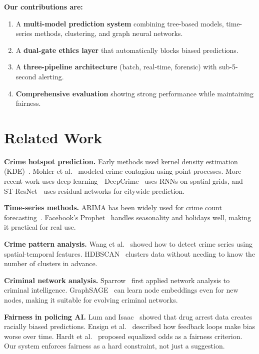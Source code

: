 \documentclass[a4paper,10pt,twocolumn]{article}
\begin{document}
\textbf{Our contributions are:}
\begin{enumerate}
  \item A \textbf{multi-model prediction system} combining tree-based models, time-series methods, clustering, and graph neural networks.
  \item A \textbf{dual-gate ethics layer} that automatically blocks biased predictions.
  \item A \textbf{three-pipeline architecture} (batch, real-time, forensic) with sub-5-second alerting.
  \item \textbf{Comprehensive evaluation} showing strong performance while maintaining fairness.
\end{enumerate}

\section{Related Work}

\textbf{Crime hotspot prediction.} Early methods used kernel density estimation (KDE)~\cite{chainey2008utility}. Mohler et al.~\cite{mohler2011self} modeled crime contagion using point processes. More recent work uses deep learning---DeepCrime~\cite{huang2018deepcrime} uses RNNs on spatial grids, and ST-ResNet~\cite{zhang2017deep} uses residual networks for citywide prediction.

\textbf{Time-series methods.} ARIMA has been widely used for crime count forecasting~\cite{chen2008forecasting}. Facebook's Prophet~\cite{taylor2018forecasting} handles seasonality and holidays well, making it practical for real use.

\textbf{Crime pattern analysis.} Wang et al.~\cite{wang2013automatic} showed how to detect crime series using spatial-temporal features. HDBSCAN~\cite{mcinnes2017hdbscan} clusters data without needing to know the number of clusters in advance.

\textbf{Criminal network analysis.} Sparrow~\cite{sparrow1991application} first applied network analysis to criminal intelligence. GraphSAGE~\cite{hamilton2017inductive} can learn node embeddings even for new nodes, making it suitable for evolving criminal networks.

\textbf{Fairness in policing AI.} Lum and Isaac~\cite{lum2016predict} showed that drug arrest data creates racially biased predictions. Ensign et al.~\cite{ensign2018runaway} described how feedback loops make bias worse over time. Hardt et al.~\cite{hardt2016equality} proposed equalized odds as a fairness criterion. Our system enforces fairness as a hard constraint, not just a suggestion.
\end{document}

